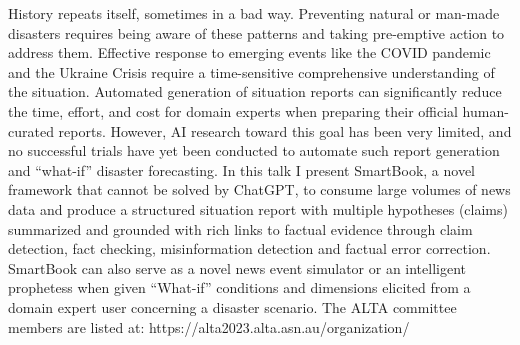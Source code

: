 History repeats itself, sometimes in a bad way. Preventing natural or man-made disasters requires being aware of these patterns and taking pre-emptive action to address them. Effective response to emerging events like the COVID pandemic and the Ukraine Crisis require a time-sensitive comprehensive understanding of the situation. Automated generation of situation reports can significantly reduce the time, effort, and cost for domain experts when preparing their official human-curated reports. However, AI research toward this goal has been very limited, and no successful trials have yet been conducted to automate such report generation and “what-if” disaster forecasting. In this talk I present SmartBook, a novel framework that cannot be solved by ChatGPT, to consume large volumes of news data and produce a structured situation report with multiple hypotheses (claims) summarized and grounded with rich links to factual evidence through claim detection, fact checking, misinformation detection and factual error correction. SmartBook can also serve as a novel news event simulator or an intelligent prophetess when given “What-if” conditions and dimensions elicited from a domain expert user concerning a disaster scenario.
The ALTA committee members are listed at:
https://alta2023.alta.asn.au/organization/
